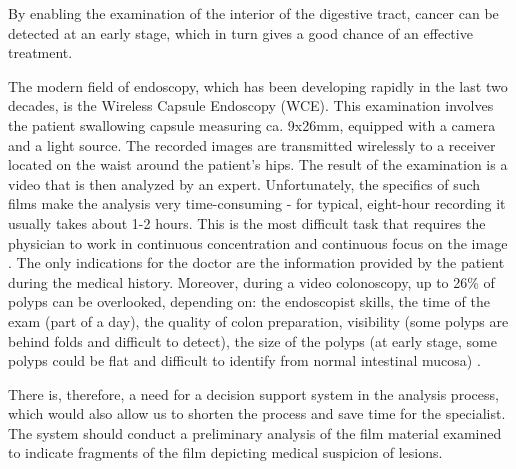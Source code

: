 \documentclass[preprint]{article}
\begin{document}
By enabling the examination of the interior of the digestive tract, cancer can be detected at an early stage, which in turn gives a good chance of an effective treatment. 

The modern field of endoscopy, which has been developing rapidly in the last two decades, is the Wireless Capsule Endoscopy (WCE). This examination involves the patient swallowing capsule measuring ca. 9x26mm, equipped with a camera and a light source. The recorded images are transmitted wirelessly to a receiver located on the waist around the patient's hips. The result of the examination is a video that is then analyzed by an expert. Unfortunately, the specifics of such films make the analysis very time-consuming - for typical, eight-hour recording it usually takes about 1-2 hours. This is the most difficult task that requires the physician to work in continuous concentration and continuous focus on the image \cite{Hewett2010}. The only indications for the doctor are the information provided by the patient during the medical history. Moreover, during a video colonoscopy,  up to 26\% of polyps can be overlooked, depending on: the endoscopist skills, the time of the exam (part of a day), the quality of colon preparation, visibility (some polyps are behind folds and difficult to detect), the size of the polyps (at early stage, some polyps could be flat and difficult to identify from normal intestinal mucosa) \cite{Ramsoekh2010}.


There is, therefore, a need for a decision support system in the analysis process, which would also allow us to shorten the process and save time for the specialist. The system should conduct a preliminary analysis of the film material examined to indicate fragments of the film depicting medical suspicion of lesions. 
\end{document}
